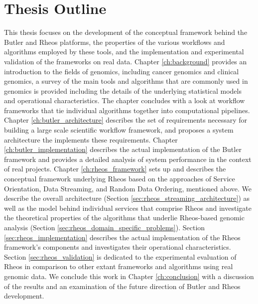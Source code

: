 \section{Thesis Outline}
This thesis focuses on the development of the conceptual framework behind the Butler and Rheos platforms, the  properties of the various workflows and algorithms employed by these tools, and the implementation and experimental validation of the frameworks on real data. Chapter \ref{ch:background} provides an introduction to the fields of genomics, including cancer genomics and clinical genomics, a survey of the main tools and algorithms that are commonly used in genomics is provided including the details of the underlying statistical models and operational characteristics. The chapter concludes with a look at workflow frameworks that tie individual algorithms together into computational pipelines. Chapter \ref{ch:butler_architecture} describes the set of requirements necessary for building a large scale scientific workflow framework, and proposes a system architecture the implements these requirements. Chapter \ref{ch:butler_implementation} describes the actual implementation of the Butler framework and provides a detailed analysis of system performance in the context of real projects. Chapter \ref{ch:rheos_framework} sets up and describes the conceptual framework underlying Rheos based on the approaches of Service Orientation, Data Streaming, and Random Data Ordering, mentioned above. We describe the overall architecture (Section \ref{sec:rheos_streaming_architecture}) as well as the model behind individual services that comprise Rheos and investigate the theoretical properties of the algorithms that underlie Rheos-based genomic analysis (Section \ref{sec:rheos_domain_specific_problems}). Section \ref{sec:rheos_implementation} describes the actual implementation of the Rheos framework's components and investigates their operational characteristics. Section \ref{sec:rheos_validation} is dedicated to the experimental evaluation of Rheos in comparison to other extant frameworks and algorithms using real genomic data. We conclude this work in Chapter \ref{ch:conclusion} with a discussion of the results and an examination of the future direction of Butler and Rheos development.


